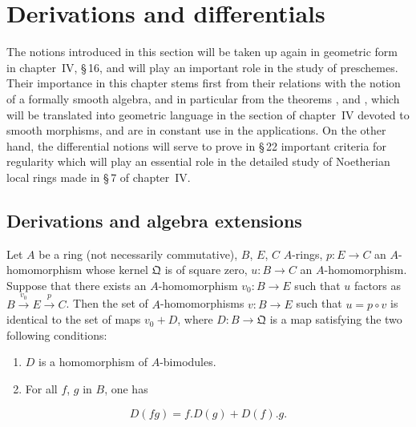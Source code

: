 \section{Derivations and differentials}
\label{section:0.20}

The notions introduced in this section will be taken up again in geometric form in chapter~IV, \S\,16, and will play an important role in the study of preschemes.
Their importance in this chapter stems first from their relations with the notion of a formally smooth algebra, and in particular from the theorems ,  and , which will be translated into geometric language in the section of chapter~IV devoted to smooth morphisms, and are in constant use in the applications.
On the other hand, the differential notions will serve to prove in \S\,22 important criteria for regularity which will play an essential role in the detailed study of Noetherian local rings made in \S\,7 of chapter~IV.

\subsection{Derivations and algebra extensions}
\label{subsection:0.20.1}

\begin{proposition}[20.1.1]
\label{0.20.1.1}
Let $A$ be a ring (not necessarily commutative), $B$, $E$, $C$ $A$-rings, $p:E\to C$ an $A$-homomorphism whose kernel $\mathfrak{Q}$ is of square zero, $u:B\to C$ an $A$-homomorphism.
Suppose that there exists an $A$-homomorphism $v_0:B\to E$ such that $u$ factors as $B\xrightarrow{v_0}E\xrightarrow{p}C$.
Then the set of $A$-homomorphisms $v:B\to E$ such that $u=p\circ v$ is identical to the set of maps $v_0+D$, where $D:B\to\mathfrak{Q}$ is a map satisfying the two following conditions:
\begin{enumerate}
  \item[\rm(i)] $D$ is a homomorphism of $A$-bimodules.
  \item[\rm(ii)] For all $f$, $g$ in $B$, one has
\end{enumerate}
\begin{equation}
\tag{20.1.1.1}
  \label{0.20.1.1.1}
  D(fg) = f.D(g) + D(f).g.
\end{equation}
\end{proposition}

